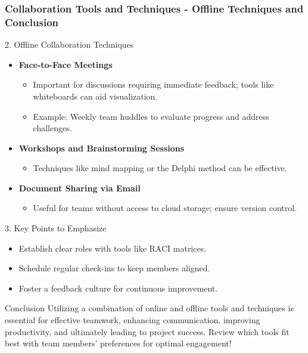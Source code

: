 \documentclass[aspectratio=169]{beamer}
\begin{document}
\begin{frame}[fragile]
    \frametitle{Collaboration Tools and Techniques - Offline Techniques and Conclusion}
    \begin{block}{2. Offline Collaboration Techniques}
        \begin{itemize}
            \item \textbf{Face-to-Face Meetings}
                \begin{itemize}
                    \item Important for discussions requiring immediate feedback; tools like whiteboards can aid visualization.
                    \item Example: Weekly team huddles to evaluate progress and address challenges.
                \end{itemize}
            \item \textbf{Workshops and Brainstorming Sessions}
                \begin{itemize}
                    \item Techniques like mind mapping or the Delphi method can be effective.
                \end{itemize}
            \item \textbf{Document Sharing via Email}
                \begin{itemize}
                    \item Useful for teams without access to cloud storage; ensure version control.
                \end{itemize}
        \end{itemize}
    \end{block}
    
    \begin{block}{3. Key Points to Emphasize}
        \begin{itemize}
            \item Establish clear roles with tools like RACI matrices.
            \item Schedule regular check-ins to keep members aligned.
            \item Foster a feedback culture for continuous improvement.
        \end{itemize}
    \end{block}
    
    \begin{block}{Conclusion}
        Utilizing a combination of online and offline tools and techniques is essential for effective teamwork, 
        enhancing communication, improving productivity, and ultimately leading to project success.
        Review which tools fit best with team members’ preferences for optimal engagement!
    \end{block}
\end{frame}
\end{document}
